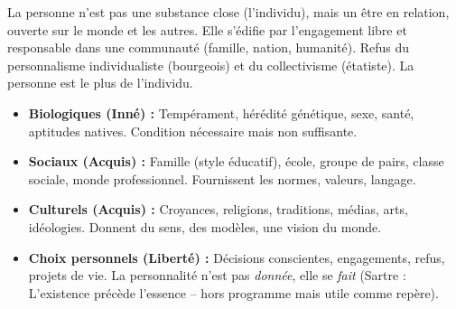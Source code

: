 \documentclass[11pt]{article}
\newcommand{\cle}[1]{{\popxbold\color{popdark}#1}}
\begin{document}
\begin{definition}
La personne n'est pas une substance close (l'individu), mais un \cle{être en relation}, ouverte sur le monde et les autres. Elle s'édifie par l'\cle{engagement} libre et responsable dans une \cle{communauté} (famille, nation, humanité). Refus du personnalisme individualiste (bourgeois) et du collectivisme (étatiste). \og{} La personne est le plus de l'individu. \fg{}
\end{definition}

\begin{propriete}
\begin{itemize}
    \item \textbf{Biologiques (Inné) :} Tempérament, hérédité génétique, sexe, santé, aptitudes natives. Condition nécessaire mais non suffisante.
    \item \textbf{Sociaux (Acquis) :} Famille (style éducatif), école, groupe de pairs, classe sociale, monde professionnel. Fournissent les normes, valeurs, langage.
    \item \textbf{Culturels (Acquis) :} Croyances, religions, traditions, médias, arts, idéologies. Donnent du sens, des modèles, une vision du monde.
    \item \textbf{Choix personnels (Liberté) :} Décisions conscientes, engagements, refus, projets de vie. La personnalité n'est pas \textit{donnée}, elle se \textit{fait} (Sartre : \og{} L'existence précède l'essence \fg{} -- hors programme mais utile comme repère).
\end{itemize}
\end{propriete}
\end{document}
